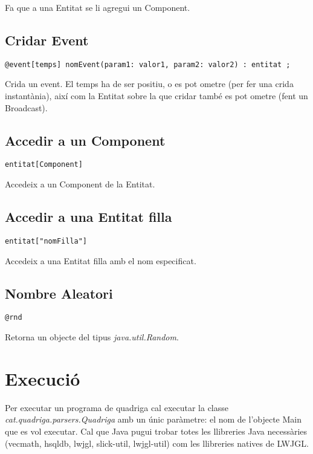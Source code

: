 Fa que a una Entitat se li agregui un Component.

\subsection{Cridar Event}

\begin{verbatim}
@event[temps] nomEvent(param1: valor1, param2: valor2) : entitat ;
\end{verbatim}

Crida un event. El temps ha de ser positiu, o es pot ometre (per fer una crida instantània), així com la Entitat sobre la que cridar també es pot ometre (fent un Broadcast).

\subsection{Accedir a un Component}

\begin{verbatim}
entitat[Component]
\end{verbatim}

Accedeix a un Component de la Entitat.

\subsection{Accedir a una Entitat filla}

\begin{verbatim}
entitat["nomFilla"]
\end{verbatim}

Accedeix a una Entitat filla amb el nom especificat.

\subsection{Nombre Aleatori}

\begin{verbatim}
@rnd
\end{verbatim}

Retorna un objecte del tipus {\em java.util.Random}.

\section{Execució}

Per executar un programa de quadriga cal executar la classe {\em cat.quadriga.parsers.Quadriga} amb un únic paràmetre: el nom de l'objecte Main que es vol executar. Cal que Java pugui trobar totes les llibreries Java necessàries (vecmath, hsqldb, lwjgl, slick-util, lwjgl-util) com les llibreries natives de LWJGL.
